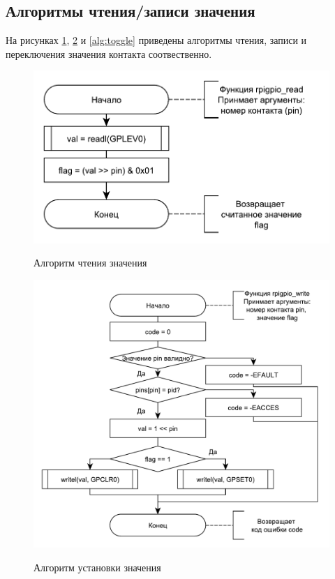 \subsection{Алгоритмы чтения/записи значения}
На рисунках \ref{alg:read}, \ref{alg:write} и \ref{alg:toggle} приведены алгоритмы чтения, записи и переключения значения контакта соотвественно.
\begin{figure}[h!] 
	\begin{center}
		{\includegraphics[scale=0.7, angle=0]{img/read.pdf}}
		\caption{Алгоритм чтения значения}
		\label{alg:read}
	\end{center}
\end{figure}

\begin{figure}[h!] 
	\begin{center}
		{\includegraphics[scale=0.7, angle=0]{img/write.pdf}}
		\caption{Алгоритм установки значения}
		\label{alg:write}
	\end{center}
\end{figure}


